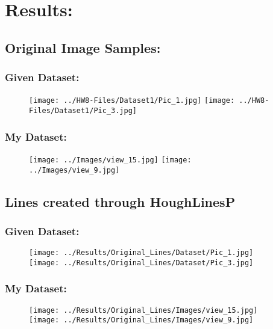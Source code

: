\documentclass{article}
\begin{document}
\section{Results:}
\subsection{Original Image Samples:}
\subsubsection*{Given Dataset:}
\begin{figure}[H]
    \centering
    \texttt{[image: ../HW8-Files/Dataset1/Pic\_1.jpg]}
    \texttt{[image: ../HW8-Files/Dataset1/Pic\_3.jpg]}
\end{figure}

\subsubsection*{My Dataset:}
\begin{figure}[H]
    \centering
    \texttt{[image: ../Images/view\_15.jpg]}
    \texttt{[image: ../Images/view\_9.jpg]}
\end{figure}


\subsection{Lines created through HoughLinesP}
\subsubsection*{Given Dataset:}
\begin{figure}[H]
    \centering
    \texttt{[image: ../Results/Original\_Lines/Dataset/Pic\_1.jpg]}
    \texttt{[image: ../Results/Original\_Lines/Dataset/Pic\_3.jpg]}
\end{figure}

\subsubsection*{My Dataset:}
\begin{figure}[H]
    \centering
    \texttt{[image: ../Results/Original\_Lines/Images/view\_15.jpg]}
    \texttt{[image: ../Results/Original\_Lines/Images/view\_9.jpg]}
\end{figure}
\end{document}
